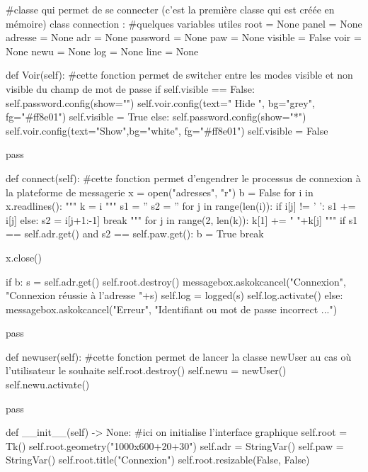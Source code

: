 \begin{Pythoncode}[numbers=left, caption={Python Code}]
#classe qui permet de se connecter (c'est la première classe qui est créée en mémoire)
class connection :
    #quelques variables utiles
    root = None
    panel = None
    adresse = None
    adr = None
    password = None
    paw = None
    visible = False
    voir = None
    newu = None
    log = None
    line = None

    def Voir(self):
        #cette fonction permet de switcher entre les modes visible et non visible du champ de mot de passe
        if self.visible == False:
            self.password.config(show="")
            self.voir.config(text=" Hide ", bg="grey", fg="#ff8e01")
            self.visible = True
        else:
            self.password.config(show="*")
            self.voir.config(text="Show",bg="white", fg="#ff8e01")
            self.visible = False

        pass

    def connect(self):
        #cette fonction permet d'engendrer le processus de connexion à la plateforme de messagerie
        x = open("adresses", "r")
        b = False
        for i in x.readlines():
            """ k = i """
            s1 = ''
            s2 = ''
            for j in range(len(i)):
                if i[j] != ' ':
                    s1 += i[j]
                else:
                    s2 = i[j+1:-1]
                    break
            """ for j in range(2, len(k)):
                k[1] += " "+k[j] """
            if s1 == self.adr.get() and s2 == self.paw.get():
                b = True
                break

        x.close()

        if b:
            s = self.adr.get()
            self.root.destroy()
            messagebox.askokcancel("Connexion", "Connexion réussie à l'adresse "+s)
            self.log = logged(s)
            self.log.activate()
        else:
            messagebox.askokcancel("Erreur", "Identifiant ou mot de passe incorrect ...")

        pass

    def newuser(self):
        #cette fonction permet de lancer la classe newUser au cas où l'utilisateur le souhaite
        self.root.destroy()
        self.newu = newUser()
        self.newu.activate()

        pass

    def __init__(self) -> None:
        #ici on initialise l'interface graphique
        self.root = Tk()
        self.root.geometry("1000x600+20+30")
        self.adr = StringVar()
        self.paw = StringVar()
        self.root.title("Connexion")
        self.root.resizable(False, False)


\end{Pythoncode}
